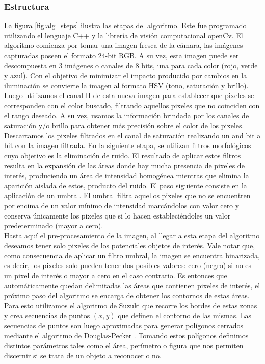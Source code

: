 \subsubsection{Estructura}
La figura \ref{fig:alg_steps} ilustra las etapas del algoritmo. Este fue programado utilizando el lenguaje C++ y la librería de visión computacional openCv.
El algoritmo comienza por tomar una imagen fresca de la cámara, las imágenes capturadas poseen el formato 24-bit RGB. A su vez, esta imagen puede ser descompuesta en 3 imágenes o canales de 8 bits, una para cada color (rojo, verde y azul). Con el objetivo de minimizar el impacto producido por cambios en la iluminación se convierte la imagen al formato HSV (tono, saturación y brillo). Luego utilizamos el canal H de esta nueva imagen para establecer que pixeles se corresponden con el color buscado, filtrando aquellos pixeles que no coinciden con el rango deseado. A su vez, usamos la información brindada por los  canales de saturación y/o brillo para obtener más precisión sobre el color de los pixeles.\\
	\indent Descartamos los pixeles filtrados en el canal de saturación realizando un and bit a bit con la imagen filtrada.  En la siguiente etapa, se utilizan filtros morfológicos cuyo objetivo es la eliminación de ruido. El resultado de aplicar estos filtros resulta en la expansión de las áreas donde hay mucha presencia de pixeles de interés, produciendo un área de intensidad homogénea mientras que elimina la aparición aislada de estos, producto del ruido. El paso siguiente consiste en la aplicación de un umbral. El umbral filtra aquellos pixeles que no se encuentren por encima de un valor mínimo de intensidad marcándolos con valor cero y conserva únicamente los pixeles que si lo hacen estableciéndoles un valor predeterminado (mayor a cero). \\
	\indent Hasta aquí el pre-procesamiento de la imagen, al llegar a esta etapa del algoritmo deseamos tener solo pixeles de los potenciales objetos de interés. Vale notar que, como consecuencia de aplicar un filtro umbral, la imagen se encuentra binarizada, es decir, los pixeles solo pueden tener dos posibles valores: cero (negro) si no es un pixel de interés o mayor a cero en el caso contrario. Es entonces que automáticamente quedan delimitadas las áreas que contienen pixeles de interés, el próximo paso del algoritmo se encarga de obtener los contornos de estas áreas. Para esto utilizamos el algoritmo de Suzuki \cite{suzuki85} que recorre los bordes de estas zonas y crea secuencias de puntos $(x,y)$ que definen el contorno de las mismas. Las secuencias de puntos son luego aproximadas para generar polígonos cerrados mediante el algoritmo de Douglas-Pecker \cite{dp74}. Tomando estos polígonos definimos distintos parámetros tales como el área, perímetro o figura que nos permiten discernir si se trata de un objeto a reconocer o no.



